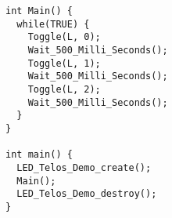


\begin{figure}
\begin{verbatim}
int Main() {
  while(TRUE) {
    Toggle(L, 0);
    Wait_500_Milli_Seconds();
    Toggle(L, 1);
    Wait_500_Milli_Seconds();
    Toggle(L, 2);
    Wait_500_Milli_Seconds();
  }
}

int main() {
  LED_Telos_Demo_create();
  Main();
  LED_Telos_Demo_destroy();
}
\end{verbatim}
\label{fig:loop}
\end{figure}
%
%
%
%
%
%
%
%
%
%
%
%
%
%
